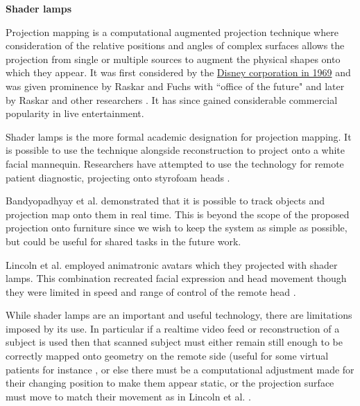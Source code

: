 \textbf{Shader lamps}

Projection mapping is a computational augmented projection technique where consideration of the relative positions and angles of complex surfaces allows the projection from single or multiple sources to augment the physical shapes onto which they appear. It was first considered by the \href{https://rabcup.com/the-history-of-3d-projection-mapping/}{Disney corporation in 1969} and was given prominence by Raskar and Fuchs with ``office of the future" \cite{Raskar1998} and later by Raskar and other researchers \cite{Raskar2001}. It has since gained considerable commercial popularity in live entertainment.\par
                    Shader lamps \cite{Raskar2001} is the more formal academic designation for projection mapping. It is possible to use the technique alongside reconstruction to project onto a white facial mannequin. Researchers have attempted to use the technology for remote patient diagnostic, projecting onto styrofoam heads  \cite{Rivera-Gutierrez2012}.\par          
                     Bandyopadhyay et al. demonstrated \cite{Bandyopadhyay2001} that it is possible to track objects and projection map \cite{Dalsgaard2011} onto them in real time. This is beyond the scope of the proposed projection onto furniture since we wish to keep the system as simple as possible, but could be useful for shared tasks in the future work.\par
                    Lincoln et al. employed animatronic avatars which they projected with shader lamps. This combination recreated facial expression and head movement though they were limited in speed and range of control of the remote head \cite{Lincoln2010}.\par
                    While shader lamps are an important and useful technology, there are limitations imposed by its use. In particular if a realtime video feed or reconstruction of a subject is used then that scanned subject must either remain still enough to be correctly mapped onto geometry on the remote side (useful for some virtual patients for instance \cite{Benjamin2012}, or else there must be a computational adjustment made for their changing position to make them appear static, or the projection surface must move to match their movement as in Lincoln et al. .
   
